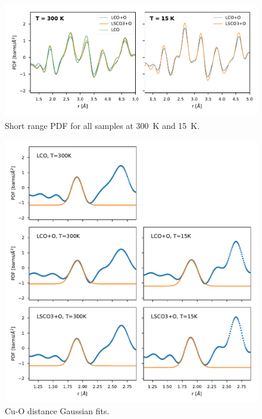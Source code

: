 \begin{figure}
    \centering
    \includegraphics[width=\textwidth]{fig/pdf/medium_range_pdf.pdf}
    \caption{Short range PDF for all samples at \SI{300}{\kelvin} and \SI{15}{\kelvin}.}
    \label{fig:medium_range_pdf}    
\end{figure}

\begin{figure}
    \centering
    \includegraphics[width=\textwidth]{fig/pdf/cu_o_fits.pdf}
    \caption{Cu-O distance Gaussian fits.}
    \label{fig:cu_o_fits}
\end{figure}


